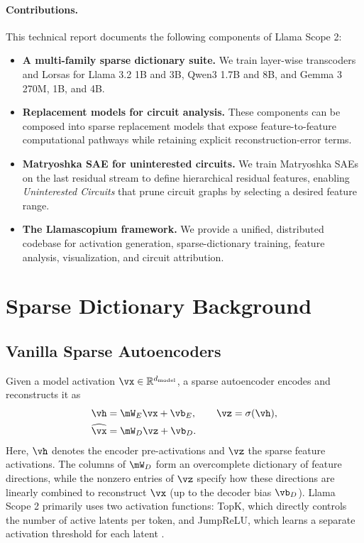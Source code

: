 \documentclass{article}
\begin{document}
\paragraph{Contributions.}
This technical report documents the following components of Llama Scope 2:
\begin{itemize}
    \item \textbf{A multi-family sparse dictionary suite.}
    We train layer-wise transcoders and Lorsas for Llama 3.2 1B and 3B, Qwen3 1.7B and
    8B, and Gemma 3 270M, 1B, and 4B.

    \item \textbf{Replacement models for circuit analysis.}
    These components can be composed into sparse replacement models that expose
    feature-to-feature computational pathways while retaining explicit
    reconstruction-error terms.

    \item \textbf{Matryoshka SAE for uninterested circuits.}
    We train Matryoshka SAEs on the last residual stream to define hierarchical
    residual features, enabling \emph{Uninterested Circuits} that prune circuit
    graphs by selecting a desired feature range.

    \item \textbf{The Llamascopium framework.}
    We provide a unified, distributed codebase for activation generation,
    sparse-dictionary training, feature analysis, visualization, and circuit
    attribution.
\end{itemize}

\section{Sparse Dictionary Background}
\label{sec:background}

\subsection{Vanilla Sparse Autoencoders}
\label{sec:vanilla_sae}

Given a model activation $\vx \in \mathbb{R}^{d_{\mathrm{model}}}$, a sparse
autoencoder encodes and reconstructs it as
\begin{equation}
\begin{aligned}
    \vh &= \mW_E \vx + \vb_E, \qquad
    \vz = \sigma(\vh), \\
    \widehat{\vx} &= \mW_D \vz + \vb_D.
\end{aligned}
\end{equation}
Here, $\vh$ denotes the encoder pre-activations and $\vz$ the sparse feature
activations. The columns of $\mW_D$ form an overcomplete dictionary of feature
directions, while the nonzero entries of $\vz$ specify how these directions are
linearly combined to reconstruct $\vx$ (up to the decoder bias $\vb_D$).
Llama Scope 2 primarily uses two activation functions: TopK, which directly controls the 
number of active latents per token, and JumpReLU, which learns a separate activation threshold 
for each latent \citep{gao2024topk, rajamanoharan2024jumprelu}.
\end{document}
